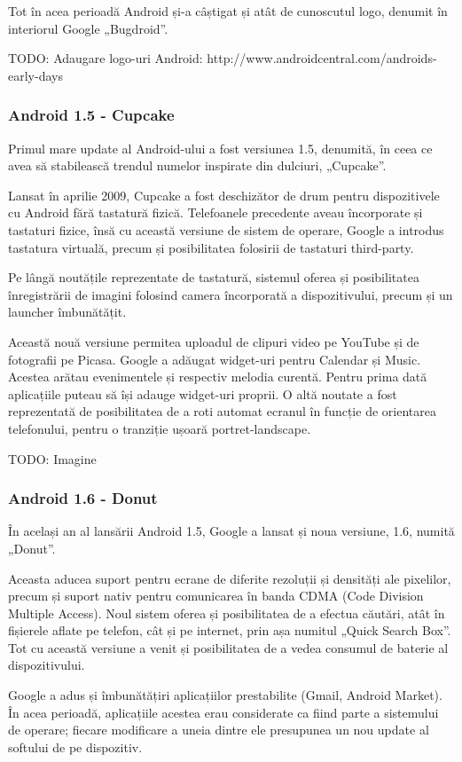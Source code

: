 \documentclass[12pt,a4paper]{article}
\begin{document}
Tot în acea perioadă Android și-a câștigat și atât de cunoscutul logo, denumit în interiorul Google „Bugdroid”.

TODO: Adaugare logo-uri Android: http://www.androidcentral.com/androids-early-days

\subsubsection{Android 1.5 - Cupcake}
Primul mare update al Android-ului a fost versiunea 1.5, denumită, în ceea ce avea să stabilească trendul numelor inspirate din dulciuri, „Cupcake”.

	Lansat în aprilie 2009, Cupcake a fost deschizător de drum pentru dispozitivele cu Android fără tastatură fizică. Telefoanele precedente aveau încorporate și tastaturi fizice, însă cu această versiune de sistem de operare, Google a introdus tastatura virtuală, precum și posibilitatea folosirii de tastaturi third-party. 

	Pe lângă noutățile reprezentate de tastatură, sistemul oferea și posibilitatea înregistrării de imagini folosind camera încorporată a dispozitivului, precum și un launcher îmbunătățit.

	Această nouă versiune permitea uploadul de clipuri video pe YouTube și de fotografii pe Picasa. Google a adăugat widget-uri pentru Calendar și Music. Acestea arătau evenimentele și respectiv melodia curentă. Pentru prima dată aplicațiile puteau să își adauge widget-uri proprii. O altă noutate a fost reprezentată de posibilitatea de a roti automat ecranul în funcție de orientarea telefonului, pentru o tranziție ușoară portret-landscape.

	TODO: Imagine

\subsubsection{Android 1.6 - Donut}
În același an al lansării Android 1.5, Google a lansat și noua versiune, 1.6, numită „Donut”.
	
	Aceasta aducea suport pentru ecrane de diferite rezoluții și densități ale pixelilor, precum și suport nativ pentru comunicarea în banda CDMA (Code Division Multiple Access). Noul sistem oferea și posibilitatea de a efectua căutări, atât în fișierele aflate pe telefon, cât și pe internet, prin așa numitul „Quick Search Box”. Tot cu această versiune a venit și posibilitatea de a vedea consumul de baterie al dispozitivului.

	Google a adus și îmbunătățiri aplicațiilor prestabilite (Gmail, Android Market). În acea perioadă, aplicațiile acestea erau considerate ca fiind parte a sistemului de operare; fiecare modificare a uneia dintre ele presupunea un nou update al softului de pe dispozitiv.
	
\end{document}
